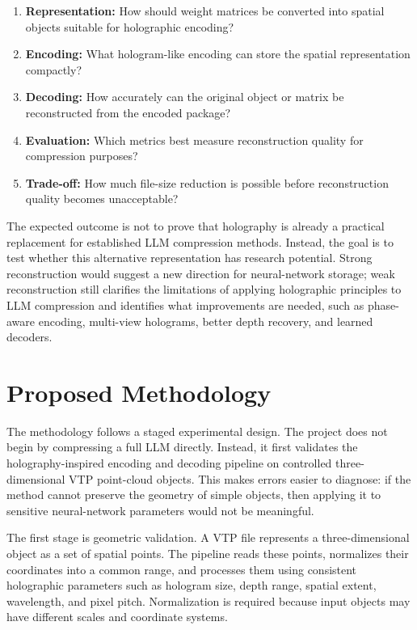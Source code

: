 \documentclass{article}
\begin{document}
\begin{normalsize}
\begin{enumerate}
    \item \textbf{Representation:} How should weight matrices be converted into spatial objects suitable for holographic encoding?
    \item \textbf{Encoding:} What hologram-like encoding can store the spatial representation compactly?
    \item \textbf{Decoding:} How accurately can the original object or matrix be reconstructed from the encoded package?
    \item \textbf{Evaluation:} Which metrics best measure reconstruction quality for compression purposes?
    \item \textbf{Trade-off:} How much file-size reduction is possible before reconstruction quality becomes unacceptable?
\end{enumerate}

The expected outcome is not to prove that holography is already a practical replacement for established LLM compression methods. Instead, the goal is to test whether this alternative representation has research potential. Strong reconstruction would suggest a new direction for neural-network storage; weak reconstruction still clarifies the limitations of applying holographic principles to LLM compression and identifies what improvements are needed, such as phase-aware encoding, multi-view holograms, better depth recovery, and learned decoders.

\section{Proposed Methodology}

The methodology follows a staged experimental design. The project does not begin by compressing a full LLM directly. Instead, it first validates the holography-inspired encoding and decoding pipeline on controlled three-dimensional VTP point-cloud objects. This makes errors easier to diagnose: if the method cannot preserve the geometry of simple objects, then applying it to sensitive neural-network parameters would not be meaningful.

The first stage is geometric validation. A VTP file represents a three-dimensional object as a set of spatial points. The pipeline reads these points, normalizes their coordinates into a common range, and processes them using consistent holographic parameters such as hologram size, depth range, spatial extent, wavelength, and pixel pitch. Normalization is required because input objects may have different scales and coordinate systems.


\end{normalsize}
\end{document}
